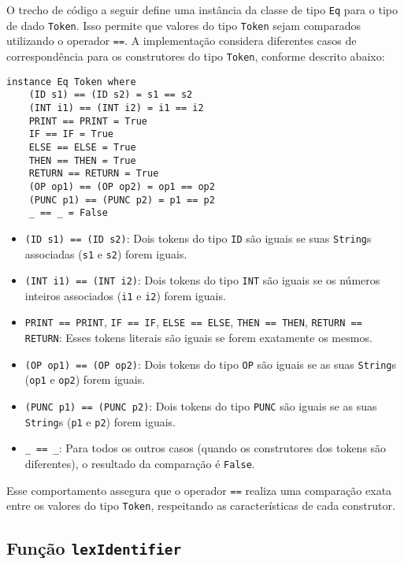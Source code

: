 \documentclass{article}
\begin{document}
O trecho de código a seguir define uma instância da classe de tipo \texttt{Eq} para o tipo de dado \texttt{Token}. Isso permite que valores do tipo \texttt{Token} sejam comparados utilizando o operador \texttt{==}. A implementação considera diferentes casos de correspondência para os construtores do tipo \texttt{Token}, conforme descrito abaixo:


\begin{verbatim}
instance Eq Token where
    (ID s1) == (ID s2) = s1 == s2
    (INT i1) == (INT i2) = i1 == i2
    PRINT == PRINT = True
    IF == IF = True
    ELSE == ELSE = True
    THEN == THEN = True
    RETURN == RETURN = True
    (OP op1) == (OP op2) = op1 == op2
    (PUNC p1) == (PUNC p2) = p1 == p2
    _ == _ = False
\end{verbatim}

\begin{itemize}
    \item \texttt{(ID s1) == (ID s2)}: Dois tokens do tipo \texttt{ID} são iguais se suas \texttt{String}s associadas (\texttt{s1} e \texttt{s2}) forem iguais.
    \item \texttt{(INT i1) == (INT i2)}: Dois tokens do tipo \texttt{INT} são iguais se os números inteiros associados (\texttt{i1} e \texttt{i2}) forem iguais.
    \item \texttt{PRINT == PRINT}, \texttt{IF == IF}, \texttt{ELSE == ELSE}, \texttt{THEN == THEN}, \texttt{RETURN == RETURN}: Esses tokens literais são iguais se forem exatamente os mesmos.
    \item \texttt{(OP op1) == (OP op2)}: Dois tokens do tipo \texttt{OP} são iguais se as suas \texttt{String}s (\texttt{op1} e \texttt{op2}) forem iguais.
    \item \texttt{(PUNC p1) == (PUNC p2)}: Dois tokens do tipo \texttt{PUNC} são iguais se as suas \texttt{String}s (\texttt{p1} e \texttt{p2}) forem iguais.
    \item \texttt{\_ == \_}: Para todos os outros casos (quando os construtores dos tokens são diferentes), o resultado da comparação é \texttt{False}.
\end{itemize}

Esse comportamento assegura que o operador \texttt{==} realiza uma comparação exata entre os valores do tipo \texttt{Token}, respeitando as características de cada construtor.


\subsection{Função \texttt{lexIdentifier}}
\end{document}
